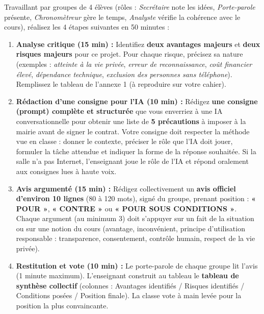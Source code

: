 \documentclass[11pt]{article}
\newcommand{\cle}[1]{{\popxbold\color{popdark}#1}}
\newcounter{popsec}
\newcounter{popsub}
\newcommand{\courssub}[1]{%
  \stepcounter{popsub}%
  \par\vspace{9pt}\noindent{\popxbold\fontsize{11.5}{13}\selectfont\color{popink}{\color{poporange}\thepopsec.\thepopsub}\hspace{6pt}#1}\par\nopagebreak\vspace{4pt}
}
\begin{document}
\courssub{Consignes}
Travaillant par groupes de 4 élèves (rôles : \emph{Secrétaire} note les idées, \emph{Porte-parole} présente, \emph{Chronomètreur} gère le temps, \emph{Analyste} vérifie la cohérence avec le cours), réalisez les 4 étapes suivantes en 50 minutes :

\begin{enumerate}
    \item \textbf{Analyse critique (15 min) :} Identifiez \textbf{deux avantages majeurs} et \textbf{deux risques majeurs} pour ce projet. Pour chaque risque, précisez sa nature (exemples : \emph{atteinte à la vie privée}, \emph{erreur de reconnaissance}, \emph{coût financier élevé}, \emph{dépendance technique}, \emph{exclusion des personnes sans téléphone}). Remplissez le tableau de l'annexe 1 (à reproduire sur votre cahier).
    \item \textbf{Rédaction d'une consigne pour l'IA (10 min) :} Rédigez \textbf{une consigne (prompt) complète et structurée} que vous enverriez à une IA conversationnelle pour obtenir une liste de \textbf{5 précautions} à imposer à la mairie avant de signer le contrat. Votre consigne doit respecter la méthode vue en classe : donner le \cle{contexte}, préciser le \cle{rôle} que l'IA doit jouer, formuler la \cle{tâche} attendue et indiquer la \cle{forme} de la réponse souhaitée. Si la salle n'a pas Internet, l'enseignant joue le rôle de l'IA et répond oralement aux consignes lues à haute voix.
    \item \textbf{Avis argumenté (15 min) :} Rédigez collectivement un \textbf{avis officiel d'environ 10 lignes} (80 à 120 mots), signé du groupe, prenant position : \textbf{« POUR »}, \textbf{« CONTRE »} ou \textbf{« POUR SOUS CONDITIONS »}. Chaque argument (au minimum 3) doit s'appuyer sur un fait de la situation ou sur une notion du cours (avantage, inconvénient, principe d'utilisation responsable : transparence, consentement, contrôle humain, respect de la vie privée).
    \item \textbf{Restitution et vote (10 min) :} Le porte-parole de chaque groupe lit l'avis (1 minute maximum). L'enseignant construit au tableau le \textbf{tableau de synthèse collectif} (colonnes : Avantages identifiés / Risques identifiés / Conditions posées / Position finale). La classe vote à main levée pour la position la plus convaincante.
\end{enumerate}
\end{document}
